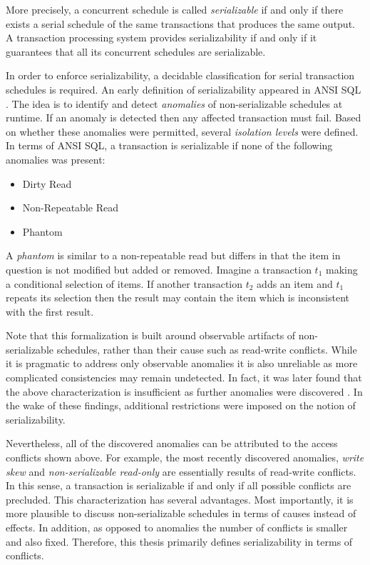 More precisely, a concurrent schedule is called \emph{serializable} if and only
if there exists a serial schedule of the same transactions that produces the
same output. A transaction processing system provides serializability if and
only if it guarantees that all its concurrent schedules are serializable.


In order to enforce serializability, a decidable classification for serial
transaction schedules is required. An early definition of serializability
appeared in ANSI SQL \cite{berenson1995critique, melton1993understanding}. The
idea is to identify and detect \emph{anomalies} of non-serializable schedules at
runtime. If an anomaly is detected then any affected transaction must fail.
Based on whether these anomalies were permitted, several \emph{isolation levels}
were defined. In terms of ANSI SQL, a transaction is serializable if none of the
following anomalies was present:

\begin{itemize}
    \item Dirty Read
    \item Non-Repeatable Read
    \item Phantom
\end{itemize}

A \emph{phantom} is similar to a non-repeatable read but differs in that the
item in question is not modified but added or removed. Imagine a transaction
$t_1$ making a conditional selection of items. If another transaction $t_2$ adds
an item and $t_1$ repeats its selection then the result may contain the item
which is inconsistent with the first result.

Note that this formalization is built around observable artifacts of
non-serializable schedules, rather than their cause such as read-write
conflicts. While it is pragmatic to address only observable anomalies it is also
unreliable as more complicated consistencies may remain undetected. In fact, it
was later found that the above characterization is insufficient as further
anomalies were discovered \cite{berenson1995critique, fekete2004read}. In the
wake of these findings, additional restrictions were imposed on the notion of
serializability.

Nevertheless, all of the discovered anomalies can be attributed to the access
conflicts shown above. For example, the most recently discovered anomalies,
\emph{write skew} and \emph{non-serializable read-only} are essentially results
of read-write conflicts. In this sense, a transaction is serializable if and
only if all possible conflicts are precluded. This characterization has several
advantages. Most importantly, it is more plausible to discuss non-serializable
schedules in terms of causes instead of effects. In addition, as opposed to
anomalies the number of conflicts is smaller and also fixed. Therefore, this
thesis primarily defines serializability in terms of conflicts.
